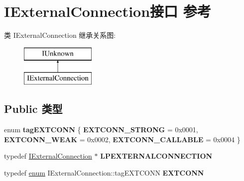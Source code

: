 \hypertarget{interface_i_external_connection}{}\section{I\+External\+Connection接口 参考}
\label{interface_i_external_connection}
类 I\+External\+Connection 继承关系图\+:\begin{figure}[H]
\begin{center}
\leavevmode
\includegraphics[height=2.000000cm]{interface_i_external_connection}
\end{center}
\end{figure}
\subsection*{Public 类型}
\begin{DoxyCompactItemize}
\item 
\mbox{\label{interface_i_external_connection_ae79c0143ab8eda18a1ccb144da71a4ed}} 
enum {\bfseries tag\+E\+X\+T\+C\+O\+NN} \{ {\bfseries E\+X\+T\+C\+O\+N\+N\+\_\+\+S\+T\+R\+O\+NG} = 0x0001, 
{\bfseries E\+X\+T\+C\+O\+N\+N\+\_\+\+W\+E\+AK} = 0x0002, 
{\bfseries E\+X\+T\+C\+O\+N\+N\+\_\+\+C\+A\+L\+L\+A\+B\+LE} = 0x0004
 \}
\item 
\mbox{\label{interface_i_external_connection_ad6357b76663cddc5b2cc8fe899589405}} 
typedef \hyperlink{interface_i_external_connection}{I\+External\+Connection} $\ast$ {\bfseries L\+P\+E\+X\+T\+E\+R\+N\+A\+L\+C\+O\+N\+N\+E\+C\+T\+I\+ON}
\item 
\mbox{\label{interface_i_external_connection_adb4f7a8f83e2e5e1bc443ee3a0402df2}} 
typedef \hyperlink{interfaceenum}{enum} I\+External\+Connection\+::tag\+E\+X\+T\+C\+O\+NN {\bfseries E\+X\+T\+C\+O\+NN}
\end{DoxyCompactItemize}
